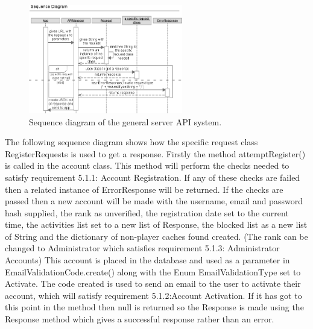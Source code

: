 \begin{figure}
    \includegraphics[width=0.6\textwidth]{images/sequence/Servergeneral}
    \caption{Sequence diagram of the general server API system.}
    \label{fig:serverGeneral}
\end{figure}
The following sequence diagram shows how the specific request class RegisterRequests is used to get a response. Firstly the method attemptRegister() is called in the account class. This method will perform the checks needed to satisfy requirement 5.1.1: Account Registration. If any of these checks are failed then a related instance of ErrorResponse will be returned. If the checks are passed then a new account will be made with the username, email and password hash supplied, the rank as unverified, the registration date set to the current time, the activities list set to a new list of Response, the blocked list as a new list of String and the dictionary of non-player caches found created. (The rank can be changed to Administrator which satisfies requirement 5.1.3: Administrator Accounts) This account is placed in the database and used as a parameter in EmailValidationCode.create() along with the Enum EmailValidationType set to Activate. The code created is used to send an email to the user to activate their account, which will satisfy requirement 5.1.2:Account Activation. If it has got to this point in the method then null is returned so the Response is made using the Response method which gives a successful response rather than an error.


